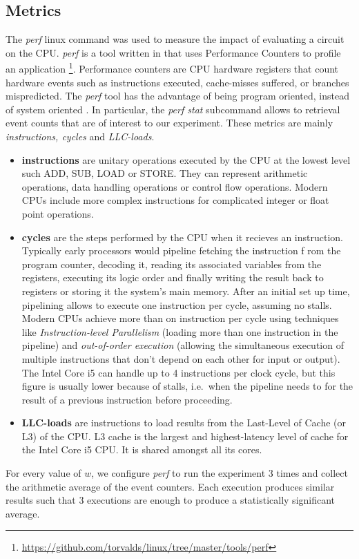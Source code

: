 \subsection{Metrics}
The \textit{perf} linux command was used to measure the impact of evaluating a
circuit on the CPU. \textit{perf} is a tool written in  that uses
Performance Counters to profile an application
\footnote{\url{https://github.com/torvalds/linux/tree/master/tools/perf}}.
Performance counters are CPU hardware registers that count hardware events such
as instructions executed, cache-misses suffered, or branches mispredicted\cite{perfwiki}.
The \textit{perf} tool has the advantage of being program oriented, instead of
system oriented \cite{ibm}.   In particular, the \textit{perf stat} subcommand
allows to retrieval event counts that are of interest to our experiment. These
metrics are mainly \textit{instructions, cycles} and \textit{LLC-loads}.
\begin{itemize}
\item \textbf{instructions} are unitary operations executed by the CPU at the
lowest level such ADD, SUB, LOAD or STORE. They can represent arithmetic operations,
data handling operations or control flow operations. Modern CPUs include more
complex instructions for complicated integer or float point operations.
\item \textbf{cycles} are the steps performed by the CPU when it recieves an
instruction. Typically early processors would pipeline fetching the instruction f
rom the program counter, decoding it, reading its associated variables from the
registers, executing its logic order and finally writing the result back to
registers or storing it the system's main memory\cite{jmor}. After an initial
set up time, pipelining allows to execute one instruction per cycle, assuming no
stalls. Modern CPUs achieve more than on instruction per cycle using techniques
like \textit{Instruction-level Parallelism} (loading more than one instruction
in the pipeline) and \textit{out-of-order execution} (allowing the simultaneous
execution of multiple instructions that don't depend on each other for input or
output). The Intel Core i5 can handle up to 4 instructions per clock cycle\cite{agner},
but this figure is usually lower because of stalls, i.e.\ when the pipeline
needs to for the result of a previous instruction before proceeding.

\item \textbf{LLC-loads} are instructions to load results from the Last-Level of
Cache (or L3) of the CPU. L3 cache is the largest and highest-latency level of
cache for the Intel Core i5 CPU. It is shared amongst all its cores.

\end{itemize}
For every value of $w$, we configure \textit{perf} to run the experiment 3 times
and collect the arithmetic average of the event counters. Each execution produces
similar results such that 3 executions are enough to produce a statistically
significant average.


